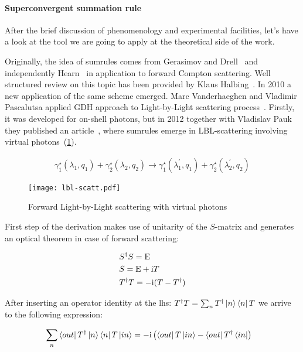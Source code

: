 \paragraph{Superconvergent summation rule}
After the brief discussion of phenomenology and experimental facilities, let's have a look at the tool we are going to apply at the theoretical side of the work.

Originally,  the idea of sumrules comes from Gerasimov and Drell~\cite{gdh-g-orig} and independently Hearn~\cite{gdh-dh-orig} in application to forward Compton scattering. Well structured review on this topic has been provided by Klaus Halbing~\cite{gdh-helbing}. In 2010 a new application of the same scheme emerged. Marc Vanderhaeghen and Vladimir Pascalutsa applied GDH approach to Light-by-Light scattering process~\cite{lbl-sum1}. Firstly, it was developed for on-shell photons, but in 2012 together with Vladislav Pauk they published an article~\cite{lbl-sum2}, where sumrules emerge in LBL-scattering involving virtual photons~(\cref{fig:lbl-scatt}). 

\begin{align} \label{eq:lbl-scatt}
    \gamma^\star_1(\lambda_1, q_1) + \gamma^\star_2(\lambda_2, q_2) \rightarrow \gamma^\star_1(\lambda_1^\prime, q_1) + \gamma^\star_2(\lambda_2^\prime, q_2) 
\end{align}

\begin{figure}
    \centering
    \texttt{[image: lbl-scatt.pdf]}
    \caption{Forward Light-by-Light scattering with virtual photons \label{fig:lbl-scatt}}
\end{figure}

First step of the derivation makes use of unitarity of the $S$-matrix and generates an optical theorem in case of forward scattering:

\begin{align}
    & S^\dag S = \mathrm{E} \\
    & S = \mathrm{E} + \mathrm{i} T \\
    & T^\dag T = -\mathrm{i}(T - T^\dag)
\end{align}

After inserting an operator identity at the lhs: $T^\dag T = \sum_{n} T^\dag \ket{n}\bra{n} T$ we arrive to the following expression:

\begin{align}
    & \sum_{n} \bra{out} T^\dag \ket{n}\bra{n} T \ket{in} = -\mathrm{i} \left( \bra{out} T \ket{in} - \bra{out} T^\dag \bra{in} \right)
\end{align}

